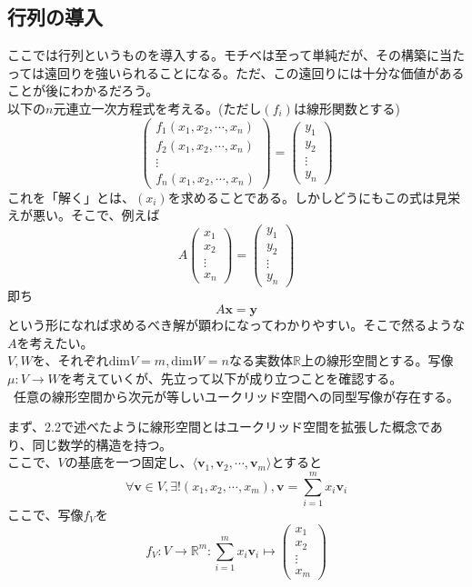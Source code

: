 \documentclass[dvipdfmx]{jsarticle}
\begin{document}
\subsection{行列の導入}
ここでは行列というものを導入する。モチベは至って単純だが、その構築に当たっては遠回りを強いられることになる。ただ、この遠回りには十分な価値があることが後にわかるだろう。\\
\motiv 以下の$n$元連立一次方程式を考える。(ただし$(f_i)$は線形関数とする)
\[\begin{pmatrix}f_1(x_1,x_2,\cdots,x_n)\\f_2(x_1,x_2,\cdots,x_n)\\\vdots\\f_n(x_1,x_2,\cdots,x_n)\end{pmatrix}=\begin{pmatrix}y_1\\y_2\\\vdots\\y_n\end{pmatrix}\]
これを「解く」とは、$(x_i)$を求めることである。しかしどうにもこの式は見栄えが悪い。そこで、例えば
\[A\begin{pmatrix}x_1\\x_2\\\vdots\\x_n\end{pmatrix}=\begin{pmatrix}y_1\\y_2\\\vdots\\y_n\end{pmatrix}\]
即ち
\[A\bm{x}=\bm{y}\]
という形になれば求めるべき解が顕わになってわかりやすい。そこで然るような$A$を考えたい。\\
\build $V,W$を、それぞれ$\mathrm{dim}V=m,\mathrm{dim}W=n$なる実数体$\mathbb{R}$上の線形空間とする。写像$\mu:V \rightarrow W$を考えていくが、先立って以下が成り立つことを確認する。\\
~任意の線形空間から次元が等しいユークリッド空間への同型写像が存在する。\\\par
まず、2.2で述べたように線形空間とはユークリッド空間を拡張した概念であり、同じ数学的構造を持つ。\\
ここで、$V$の基底を一つ固定し、$\langle\bm{v}_1,\bm{v}_2,\cdots,\bm{v}_m\rangle$とすると
\[\forall \bm{v} \in V,\exists ! (x_1,x_2,\cdots,x_m),\bm{v}=\sum_{i=1}^mx_i\bm{v}_i\]
ここで、写像$f_V$を
\[f_V:V\rightarrow\mathbb{R}^m:\sum_{i=1}^mx_i\bm{v}_i\mapsto\begin{pmatrix}x_1\\x_2\\\vdots\\x_m\end{pmatrix}\]
\end{document}
